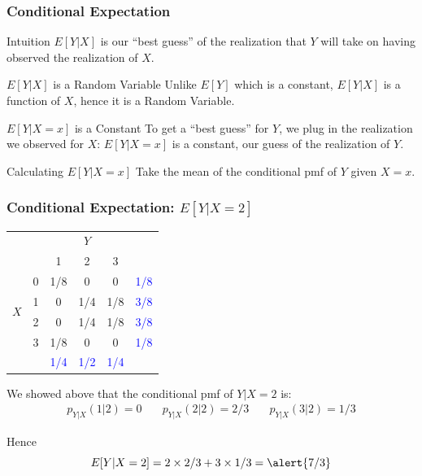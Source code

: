 \documentclass[handout]{beamer}
\begin{document}
\begin{frame}
\frametitle{Conditional Expectation}
\begin{block}{Intuition}
	$E[Y|X]$ is our ``best guess'' of the realization that $Y$ will take on having observed the realization of $X$.
\end{block}
\pause

\begin{block}{$E[Y|X]$ is a Random Variable}
Unlike $E[Y]$ which is a constant, $E[Y|X]$ is a function of $X$, hence it is a \alert{Random Variable}.
\end{block}
\pause

\begin{block}{$E[Y|X=x]$ is a Constant}
To get a ``best guess'' for $Y$, we plug in the realization we observed for $X$: $E[Y|X=x]$ is a constant, our guess of the realization of $Y$.
\end{block}\pause

\begin{block}{Calculating $E[Y|X=x]$}
Take the mean of the conditional pmf of $Y$ given $X=x$.
\end{block}

\end{frame}
\begin{frame}
	\frametitle{Conditional Expectation: $E[Y|X=2]$}

\footnotesize
\begin{table}
\begin{tabular}{|cc|ccc|c|}
\hline
&&\multicolumn{3}{c|}{$Y$}&\\
&&1 & 2&3&\\
\hline
\multirow{4}{*}{$X$}
&0& \multicolumn{1}{|c}{\alert{1/8}} & \alert{0}& \alert{0}&\textcolor{blue}{1/8}\\
&1& \multicolumn{1}{|c}{\alert{0}} & \alert{1/4}&\alert{1/8}&\textcolor{blue}{3/8}\\
&2& \multicolumn{1}{|c}{\alert{0}} & \alert{1/4}&\alert{1/8}&\textcolor{blue}{3/8}\\
&3& \multicolumn{1}{|c}{\alert{1/8}} & \alert{0}&\alert{0}&\textcolor{blue}{1/8}\\
\hline
&&\textcolor{blue}{1/4}&\textcolor{blue}{1/2}&\textcolor{blue}{1/4}&\\
\hline
\end{tabular}
\end{table}

We showed above that the conditional pmf of $Y|X=2$ is:
	$$\boxed{\begin{array}{ccc}p_{Y|X}(1|2) =0 \quad&p_{Y|X}(2|2) =2/3 \quad&p_{Y|X}(3|2) =1/3\end{array}}$$
	
	
Hence
	$$E[Y|X=2] = 2 \times 2/3 + 3 \times 1/3 =  \alert{7/3}$$

\end{frame}
\end{document}
